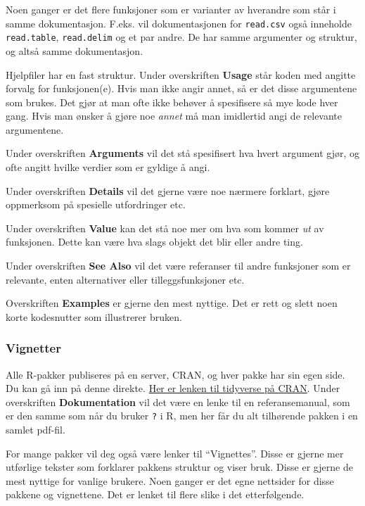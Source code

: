 \documentclass[
  letterpaper,
  DIV=11,
  numbers=noendperiod]{scrreprt}
\theoremstyle{definition}
\theoremstyle{remark}
\begin{document}
Noen ganger er det flere funksjoner som er varianter av hverandre som
står i samme dokumentasjon. F.eks. vil dokumentasjonen for
\texttt{read.csv} også inneholde \texttt{read.table},
\texttt{read.delim} og et par andre. De har samme argumenter og
struktur, og altså samme dokumentasjon.

Hjelpfiler har en fast struktur. Under overskriften \textbf{Usage} står
koden med angitte forvalg for funksjonen(e). Hvis man ikke angir annet,
så er det disse argumentene som brukes. Det gjør at man ofte ikke
behøver å spesifisere så mye kode hver gang. Hvis man ønsker å gjøre noe
\emph{annet} må man imidlertid angi de relevante argumentene.

Under overskriften \textbf{Arguments} vil det stå spesifisert hva hvert
argument gjør, og ofte angitt hvilke verdier som er gyldige å angi.

Under overskriften \textbf{Details} vil det gjerne være noe nærmere
forklart, gjøre oppmerksom på spesielle utfordringer etc.

Under overskriften \textbf{Value} kan det stå noe mer om hva som kommer
\emph{ut} av funksjonen. Dette kan være hva slags objekt det blir eller
andre ting.

Under overskriften \textbf{See Also} vil det være referanser til andre
funksjoner som er relevante, enten alternativer eller tilleggsfunksjoner
etc.

Overskriften \textbf{Examples} er gjerne den mest nyttige. Det er rett
og slett noen korte kodesnutter som illustrerer bruken.

\hypertarget{vignetter}{%
\subsubsection{Vignetter}\label{vignetter}}

Alle R-pakker publiseres på en server, CRAN, og hver pakke har sin egen
side. Du kan gå inn på denne direkte.
\href{https://cran.r-project.org/web/packages/tidyverse/index.html}{Her
er lenken til tidyverse på CRAN}. Under overskriften
\textbf{Dokumentation} vil det være en lenke til en referansemanual, som
er den samme som når du bruker \texttt{?} i R, men her får du alt
tilhørende pakken i en samlet pdf-fil.

For mange pakker vil deg også være lenker til ``Vignettes''. Disse er
gjerne mer utførlige tekster som forklarer pakkens struktur og viser
bruk. Disse er gjerne de mest nyttige for vanlige brukere. Noen ganger
er det egne nettsider for disse pakkene og vignettene. Det er lenket til
flere slike i det etterfølgende.
\end{document}
